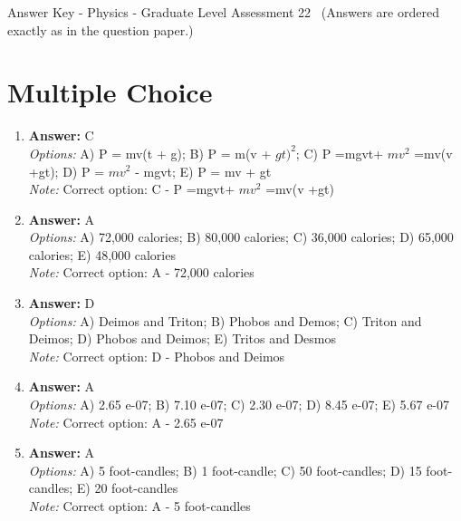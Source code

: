 \documentclass[12pt]{article}
\begin{document}
\begin{center}
Answer Key - Physics - Graduate Level Assessment 22 \
\small (Answers are ordered exactly as in the question paper.)
\end{center}

\section*{Multiple Choice}
\begin{enumerate}[label=\arabic*.]
\item \textbf{Answer:} C
\\ \textit{Options:} A) P = mv(t + g); B) P = m(v + $gt)^2$; C) P =mgvt+ $mv^2$ =mv(v +gt); D) P = $mv^2$ - mgvt; E) P = mv + gt
\\ \textit{Note:} Correct option: C - P =mgvt+ $mv^2$ =mv(v +gt)
\item \textbf{Answer:} A
\\ \textit{Options:} A) 72,000 calories; B) 80,000 calories; C) 36,000 calories; D) 65,000 calories; E) 48,000 calories
\\ \textit{Note:} Correct option: A - 72,000 calories
\item \textbf{Answer:} D
\\ \textit{Options:} A) Deimos and Triton; B) Phobos and Demos; C) Triton and Deimos; D) Phobos and Deimos; E) Tritos and Desmos
\\ \textit{Note:} Correct option: D - Phobos and Deimos
\item \textbf{Answer:} A
\\ \textit{Options:} A) 2.65 e-07; B) 7.10 e-07; C) 2.30 e-07; D) 8.45 e-07; E) 5.67 e-07
\\ \textit{Note:} Correct option: A - 2.65 e-07
\item \textbf{Answer:} A
\\ \textit{Options:} A) 5 foot-candles; B) 1 foot-candle; C) 50 foot-candles; D) 15 foot-candles; E) 20 foot-candles
\\ \textit{Note:} Correct option: A - 5 foot-candles
\end{enumerate}
\end{document}
